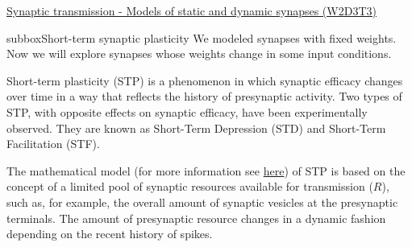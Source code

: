 \begin{textbox}{\href{https://compneuro.neuromatch.io/tutorials/W2D3_BiologicalNeuronModels/student/W2D3_Tutorial3.html}{Synaptic transmission - Models of static and dynamic synapses (W2D3T3)} }
\begin{subbox}{subbox}{Short-term synaptic plasticity}
\scriptsize
We modeled synapses with fixed weights. Now we will explore synapses whose weights change in some input conditions. 

Short-term plasticity (STP) is a phenomenon in which synaptic efficacy changes over time in a way that reflects the history of presynaptic activity. Two types of STP, with opposite effects on synaptic efficacy, have been experimentally observed. They are known as Short-Term Depression (STD) and Short-Term Facilitation (STF).

The mathematical model (for more information see \href{http://www.scholarpedia.org/article/Short-term_synaptic_plasticity}{here}) of STP is based on the concept of a limited pool of synaptic resources available for transmission ($R$), such as, for example, the overall amount of synaptic vesicles at the presynaptic terminals. The amount of presynaptic resource changes in a dynamic fashion depending on the recent history of spikes. 


\end{subbox}
\end{textbox}
